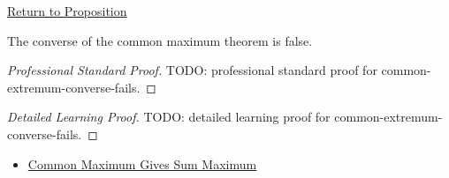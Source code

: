 \newpage
{}
\label{prf:common-extremum-converse-fails}

\begin{remark*}[Return]
\hyperref[prop:common-extremum-converse-fails]{Return to Proposition}
\end{remark*}

\begin{proposition*}
The converse of the common maximum theorem is false.
\end{proposition*}

\begin{proof}[Professional Standard Proof]
\LRAProofBodyStart
TODO: professional standard proof for common-extremum-converse-fails.
\end{proof}

\begin{proof}[Detailed Learning Proof]
\LRAProofBodyStart
TODO: detailed learning proof for common-extremum-converse-fails.
\end{proof}

\begin{remark*}
\end{remark*}

\begin{dependencies}
\begin{itemize}
  \item \hyperref[thm:common-maximum-gives-sum-maximum]{Common Maximum Gives Sum Maximum}
\end{itemize}
\end{dependencies}

\clearpage
